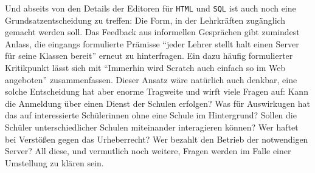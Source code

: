 Und abseits von den Details der Editoren für \texttt{HTML} und \texttt{SQL} ist auch noch eine Grundsatzentscheidung zu treffen: Die Form, in der \idename{} Lehrkräften zugänglich gemacht werden soll. Das Feedback aus informellen Gesprächen gibt zumindest Anlass, die eingangs formulierte Prämisse "`jeder Lehrer stellt halt einen Server für seine Klassen bereit"' erneut zu hinterfragen. Ein dazu häufig formulierter Kritikpunkt lässt sich mit "`Immerhin wird Scratch auch einfach so im Web angeboten"' zusammenfassen. Dieser Ansatz wäre natürlich auch denkbar, eine solche Entscheidung hat aber enorme Tragweite und wirft viele Fragen auf: Kann die Anmeldung über einen Dienst der Schulen erfolgen? Was für Auswirkugen hat das auf interessierte Schülerinnen ohne eine Schule im Hintergrund? Sollen die Schüler unterschiedlicher Schulen miteinander interagieren können? Wer haftet bei Verstößen gegen das Urheberrecht? Wer bezahlt den Betrieb der notwendigen Server? All diese, und vermutlich noch weitere, Fragen werden im Falle einer Umstellung zu klären sein.




